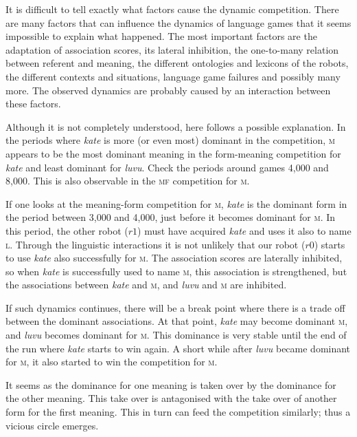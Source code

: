 It is difficult to tell exactly what factors cause the dynamic competition. There are many factors that can influence the dynamics of language games that it seems impossible to explain what happened. The most important factors are the adaptation of association scores, its lateral inhibition, the one-to-many relation between referent and meaning, the different ontologies and lexicons of the robots, the different contexts and situations, language game failures and possibly many more. The observed dynamics are probably caused by an interaction between these factors.

Although it is not completely understood, here follows a possible explanation. In the periods where {\it kate} is more (or even most) dominant in the competition, \textsc{m} appears to be the most dominant meaning in the form-meaning competition for {\it kate} and least dominant for {\it luvu}. Check the periods around games 4,000 and 8,000. This is also observable in the {\scshape mf} competition for \textsc{m}.

If one looks at the meaning-form competition for \textsc{m}, {\it kate} is the dominant form in the period between 3,000 and 4,000, just before it becomes dominant for \textsc{m}. In this period, the other robot ($r1$) must have acquired {\it kate} and uses it also to name \textsc{l}. Through the linguistic interactions it is not unlikely that our robot ($r0$) starts to use {\it kate} also successfully for \textsc{m}. The association scores are laterally inhibited, so when {\it kate} is successfully used to name \textsc{m}, this association is strengthened, but the associations between {\it kate} and \textsc{m}, and {\it luvu} and \textsc{m} are inhibited.

If such dynamics continues, there will be a break point where there is a trade off between the dominant associations. At that point, {\it kate} may become dominant {\scshape m}, and {\it luvu} becomes dominant for \textsc{m}. This dominance is very stable until the end of the run where {\it kate} starts to win again. A short while after {\it luvu} became dominant for \textsc{m}, it also started to win the competition for \textsc{m}.

It seems as the dominance for one meaning is taken over by the dominance for the other meaning. This take over is antagonised with the take over of another form for the first meaning. This in turn can feed the competition similarly; thus a vicious circle emerges.

